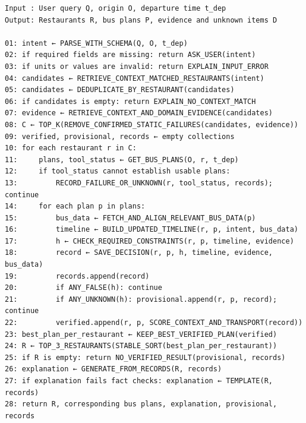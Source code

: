 \renewcommand{\lstlistingname}{演算法}   %
\begin{lstlisting}[caption={Context-first restaurant recommendation with bus analysis},label={alg:recommend}]
Input : User query Q, origin O, departure time t_dep
Output: Restaurants R, bus plans P, evidence and unknown items D

01: intent ← PARSE_WITH_SCHEMA(Q, O, t_dep)
02: if required fields are missing: return ASK_USER(intent)
03: if units or values are invalid: return EXPLAIN_INPUT_ERROR
04: candidates ← RETRIEVE_CONTEXT_MATCHED_RESTAURANTS(intent)
05: candidates ← DEDUPLICATE_BY_RESTAURANT(candidates)
06: if candidates is empty: return EXPLAIN_NO_CONTEXT_MATCH
07: evidence ← RETRIEVE_CONTEXT_AND_DOMAIN_EVIDENCE(candidates)
08: C ← TOP_K(REMOVE_CONFIRMED_STATIC_FAILURES(candidates, evidence))
09: verified, provisional, records ← empty collections
10: for each restaurant r in C:
11:     plans, tool_status ← GET_BUS_PLANS(O, r, t_dep)
12:     if tool_status cannot establish usable plans:
13:         RECORD_FAILURE_OR_UNKNOWN(r, tool_status, records); continue
14:     for each plan p in plans:
15:         bus_data ← FETCH_AND_ALIGN_RELEVANT_BUS_DATA(p)
16:         timeline ← BUILD_UPDATED_TIMELINE(r, p, intent, bus_data)
17:         h ← CHECK_REQUIRED_CONSTRAINTS(r, p, timeline, evidence)
18:         record ← SAVE_DECISION(r, p, h, timeline, evidence, bus_data)
19:         records.append(record)
20:         if ANY_FALSE(h): continue
21:         if ANY_UNKNOWN(h): provisional.append(r, p, record); continue
22:         verified.append(r, p, SCORE_CONTEXT_AND_TRANSPORT(record))
23: best_plan_per_restaurant ← KEEP_BEST_VERIFIED_PLAN(verified)
24: R ← TOP_3_RESTAURANTS(STABLE_SORT(best_plan_per_restaurant))
25: if R is empty: return NO_VERIFIED_RESULT(provisional, records)
26: explanation ← GENERATE_FROM_RECORDS(R, records)
27: if explanation fails fact checks: explanation ← TEMPLATE(R, records)
28: return R, corresponding bus plans, explanation, provisional, records
\end{lstlisting}
